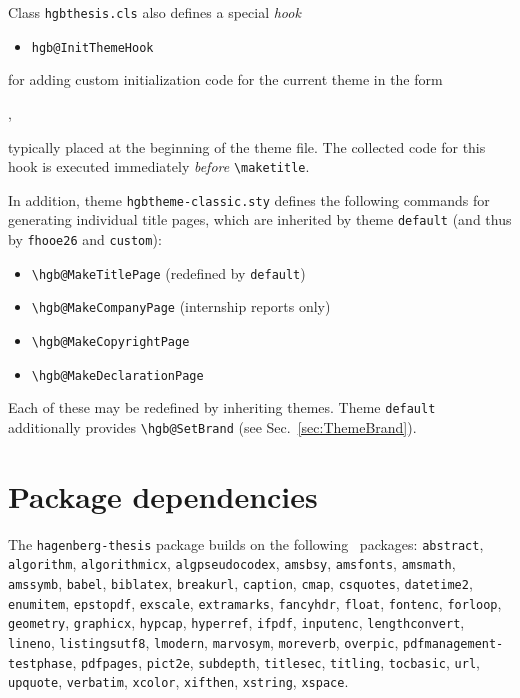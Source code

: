 \documentclass[language=english]{hgbarticle}
\begin{document}
\noindent
Class \texttt{hgbthesis.cls} also defines a special \emph{hook}
\begin{itemize}
\item[] \verb!hgb@InitThemeHook!
\end{itemize}
for adding custom initialization code for the current theme in the form
%
\begin{LaTeXCode}[numbers=none]
,
\end{LaTeXCode}
%
typically placed at the beginning of the theme file. The collected code for
this hook is executed immediately \emph{before} \verb!\maketitle!.


In addition, theme \texttt{hgbtheme-classic.sty} defines the following
commands for generating individual title pages, which are inherited by theme \texttt{default}
(and thus by \texttt{fhooe26} and \texttt{custom}):
%
\begin{itemize}
  \item[] \verb!\hgb@MakeTitlePage! (redefined by \texttt{default})
  \item[] \verb!\hgb@MakeCompanyPage! (internship reports only)
  \item[] \verb!\hgb@MakeCopyrightPage!
  \item[] \verb!\hgb@MakeDeclarationPage!
\end{itemize}
%
Each of these may be redefined by inheriting themes.
Theme \texttt{default} additionally provides \verb!\hgb@SetBrand! (see Sec.~\ref{sec:ThemeBrand}).

\section{Package dependencies}

\begin{sloppypar}
The \texttt{hagenberg-thesis} package builds on the following \latex\ packages:\newline
\texttt{abstract}, 
\texttt{algorithm}, 
\texttt{algorithmicx}, 
\texttt{algpseudocodex}, 
\texttt{amsbsy}, 
\texttt{amsfonts}, 
\texttt{amsmath}, 
\texttt{amssymb}, 
\texttt{babel}, 
\texttt{biblatex}, 
\texttt{breakurl}, 
\texttt{caption}, 
\texttt{cmap}, 
\texttt{csquotes}, 
\texttt{datetime2}, 
\texttt{enumitem}, 
\texttt{epstopdf}, 
\texttt{exscale},
\texttt{extramarks},
\texttt{fancyhdr}, 
\texttt{float}, 
\texttt{fontenc},
\texttt{forloop},
\texttt{geometry}, 
\texttt{graphicx}, 
\texttt{hypcap}, 
\texttt{hyperref}, 
\texttt{ifpdf}, 
\texttt{inputenc}, 
\texttt{lengthconvert},
\texttt{lineno},
\texttt{listingsutf8}, 
\texttt{lmodern},
\texttt{marvosym}, 
\texttt{moreverb}, 
\texttt{overpic}, 
\texttt{pdfmanagement-testphase}, 
\texttt{pdfpages}, 
\texttt{pict2e}, 
\texttt{subdepth}, 
\texttt{titlesec}, 
\texttt{titling},
\texttt{tocbasic},
\texttt{url}, 
\texttt{upquote}, 
\texttt{verbatim}, 
\texttt{xcolor}, 
\texttt{xifthen},
\texttt{xstring},
\texttt{xspace}.
\end{sloppypar}
\end{document}
